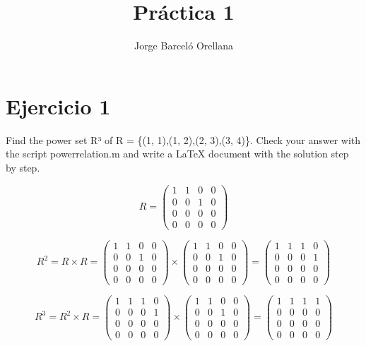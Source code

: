 \documentclass[11pt]{article}
\title{\textbf{Práctica 1}}
\author{Jorge Barceló Orellana}
\date{}
\begin{document}
\maketitle
\thispagestyle{empty}

\section*{Ejercicio 1}
Find the power set R³
of R = \{(1, 1),(1, 2),(2, 3),(3, 4)\}. Check your answer with the script powerrelation.m and write a {\LaTeX} document with the
solution step by step.


\begin{equation}
	R =
	\begin{pmatrix}
	1 & 1 & 0 & 0\\
	0 & 0 & 1 & 0\\
	0 & 0 & 0 & 0\\
	0 & 0 & 0 & 0 
	\end{pmatrix}
\end{equation}

\begin{equation}
	R^2 = R \times R = 
	\begin{pmatrix}
	1 & 1 & 0 & 0\\
	0 & 0 & 1 & 0\\
	0 & 0 & 0 & 0\\
	0 & 0 & 0 & 0 
	\end{pmatrix}
	\times
	\begin{pmatrix}
	1 & 1 & 0 & 0\\
	0 & 0 & 1 & 0\\
	0 & 0 & 0 & 0\\
	0 & 0 & 0 & 0 
	\end{pmatrix}
	=
	\begin{pmatrix}
	1 & 1 & 1 & 0\\
	0 & 0 & 0 & 1\\
	0 & 0 & 0 & 0\\
	0 & 0 & 0 & 0 
	\end{pmatrix}
\end{equation}

\begin{equation}
	R^3 = R^2 \times R = 
	\begin{pmatrix}
	1 & 1 & 1 & 0\\
	0 & 0 & 0 & 1\\
	0 & 0 & 0 & 0\\
	0 & 0 & 0 & 0 
	\end{pmatrix}
	\times
	\begin{pmatrix}
	1 & 1 & 0 & 0\\
	0 & 0 & 1 & 0\\
	0 & 0 & 0 & 0\\
	0 & 0 & 0 & 0 
	\end{pmatrix}
	=
	\begin{pmatrix}
	1 & 1 & 1 & 1\\
	0 & 0 & 0 & 0\\
	0 & 0 & 0 & 0\\
	0 & 0 & 0 & 0 
	\end{pmatrix}
\end{equation}
\end{document}
